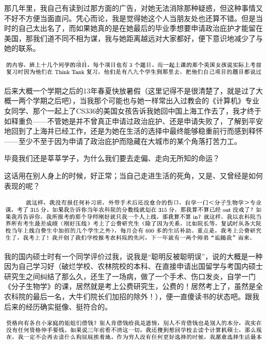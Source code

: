\documentclass[9pt, b5paper]{article}
\begin{document}
那几年里，我自己有读到过那方面的广告，对她无法消除那种疑惑，但这种事情又不好不方便当面直问。凭心而论，我是觉得她这个人当朋友处也还算不错。但是当时的自己太出名了，而如果她真的是在她最后的毕业季想要申请政治庇护才能留在美国，那我们道不同不相为谋，我与她距离越远对大家都好，便下意识地减少了与她的联系。

\begin{center}
\includegraphics[width=.9\linewidth]{./pic/backups_plans_20210502_155228.png}
\end{center}

后来大概一个学期之后的13年春夏快放暑假（这里记得不是很清楚了，就是过了大概一两个学期之后吧），当我那个可能也与她一样常出入过教会的《计算机》专业女同学、那个一起上了CS336的美国女孩告诉我她回中国上海工作去了，我才终于如释重负——不管她是并不曾真正申请过政治庇护、还是申请失败了，了解到平安地回到了上海并已经工作，还是为她在生活的选择中最终能够稳重前行而感到释怀——至少不至于因为申请了政治庇护而隐藏在大城市的某个角落打苦力工。

毕竟我们还是莘莘学子，为什么我们要去走偏、走向无所知的命运？

这话用在别人身上的时候，好正常；当自己走进生活的死角，又是、又曾经是如何表现的呢？

\begin{center}
\includegraphics[width=.9\linewidth]{./pic/backups_plans_20210502_160332.png}
\end{center}

我的国内硕士时有一个同学评价过我，说我是“聪明反被聪明误”，说的大概是一种因为自己学习好（破烂学校、农林院校的本科、在直接申请出国留学与考国内硕士研究生之间纠结了那么久，还生了一场病，做了一个手术、伤口发炎，自学一门《分子生物学》的课，居然就是考上公费研究生，公费的！居然考上了，虽然是全农科院的最后一名，大牛们院长们加招的除外！），便一直傻读书的状态吧。跟我后来的经历确实挺像、挺符合的。

\begin{center}
\includegraphics[width=.9\linewidth]{./pic/backups_plans_20210502_155852.png}
\end{center}
\end{document}
